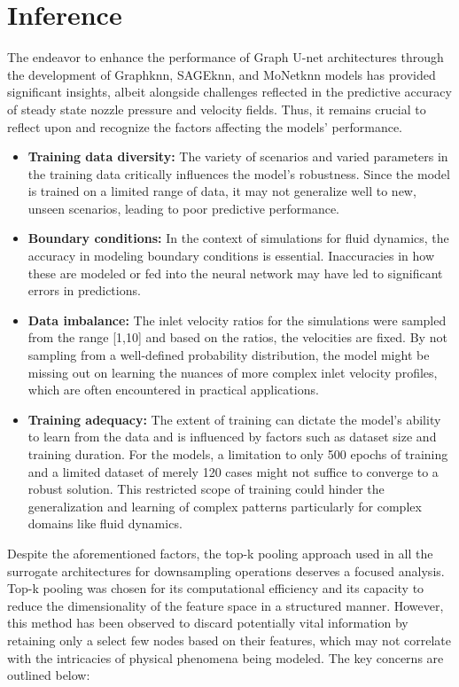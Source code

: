 \section{Inference}
The endeavor to enhance the performance of Graph U-net architectures through the development of Graphknn, SAGEknn, and MoNetknn models has provided significant insights, albeit alongside challenges reflected in the predictive accuracy of steady state nozzle pressure and velocity fields. Thus, it remains crucial to reflect upon and recognize the factors affecting the models' performance. 
\begin{itemize}
\item \textbf{Training data diversity:} The variety of scenarios and varied parameters in the training data critically influences the model's robustness. Since the model is trained on a limited range of data, it may not generalize well to new, unseen scenarios, leading to poor predictive performance.
\item \textbf{Boundary conditions:} In the context of simulations for fluid dynamics, the accuracy in modeling boundary conditions is essential. Inaccuracies in how these are modeled or fed into the neural network may have led to significant errors in predictions.
\item \textbf{Data imbalance:} The inlet velocity ratios for the simulations were sampled from the range [1,10] and based on the ratios, the velocities are fixed. By not sampling from a well-defined probability distribution, the model might be missing out on learning the nuances of more complex inlet velocity profiles, which are often encountered in practical applications.
\item \textbf{Training adequacy:} The extent of training can dictate the model's ability to learn from the data and is influenced by factors such as dataset size and training duration. For the models, a limitation to only 500 epochs of training and a limited dataset of merely 120 cases might not suffice to converge to a robust solution. This restricted scope of training could hinder the generalization and learning of complex patterns particularly for complex domains like fluid dynamics.
\end{itemize}
Despite the aforementioned factors, the top-k pooling approach used in all the surrogate architectures for downsampling operations deserves a focused analysis. Top-k pooling was chosen for its computational efficiency and its capacity to reduce the dimensionality of the feature space in a structured manner. However, this method has been observed to discard potentially vital information by retaining only a select few nodes based on their features, which may not correlate with the intricacies of physical phenomena being modeled. The key concerns are outlined below: 
